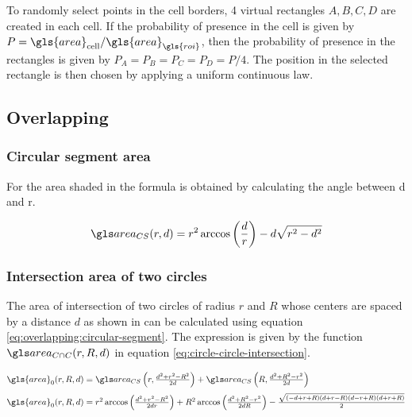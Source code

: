 \begin{appendix}

To randomly select points in the cell borders, 4 virtual rectangles \( A, B, C, D \) are created in each cell. If the probability of presence in the cell is given by \( P = \gls{area}_{\text{cell}} / \gls{area}_{\gls{roi}} \), then the probability of presence in the rectangles is given by \( P_A = P_B = P_C = P_D = P / 4 \).
The position in the selected rectangle is then chosen by applying a uniform continuous law.

\subsection{Overlapping}\label{sec:overlapping}

\subsubsection{Circular segment area}

For the area shaded in  the formula is obtained by calculating the angle between d and r.

\begin{minipage}{0.5\linewidth}
\end{minipage}%
\begin{minipage}{0.5\linewidth}
  \begin{equation}\label{eq:overlapping:circular-segment}
    \cirseg(r, d) =
      r^2 \arccos\left( \frac{d}{r} \right) - d \sqrt{r^2 - d^2}
  \end{equation}
\end{minipage}%

\subsubsection{Intersection area of two circles}\label{sec:circle-circle-intersection}

The area of intersection of two circles of radius \( r \) and \( R \) whose centers are spaced by a distance \( d \) as shown in  can be calculated using equation \eqref{eq:overlapping:circular-segment}. The expression is given by the function \( \circir (r, R, d) \) in equation \eqref{eq:circle-circle-intersection}.

\begin{align}
  \gls{area}_0 (r, R, d) & =
    \textstyle
    \cirseg \left(r, \frac{d^2 + r^2 - R^2}{2 d} \right) + \cirseg \left( R, \frac{d^2 + R^2 - r^2}{2 d} \right)
  \\[1mm]
  \gls{area}_0 (r, R, d) & =
    \textstyle
    r^2 \arccos \left( \frac{d^2 + r^2 - R^2}{2 d r} \right)
    + R^2 \arccos \left( \frac{d^2 + R^2 - r^2}{2 d R} \right)
    - \frac{\sqrt{(-d+r+R)(d+r-R)(d-r+R)(d+r+R)}}{2}
\end{align}


\end{appendix}
